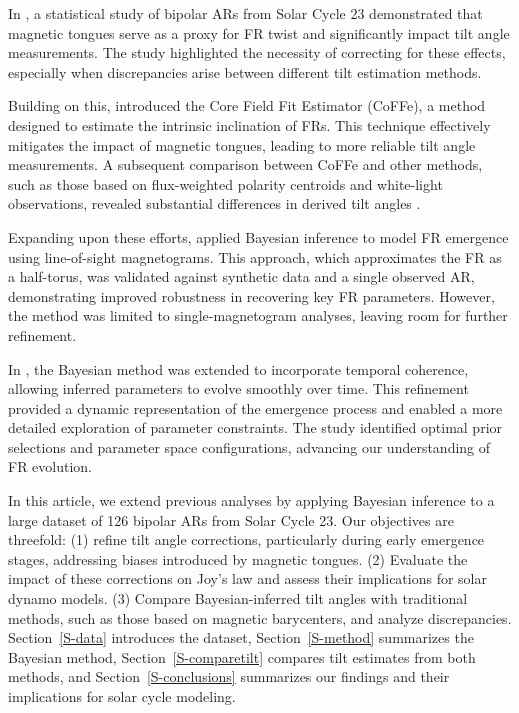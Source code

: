 \documentclass[namedreferences,hyperref,optionalrh]{spr-sola}
\begin{document}
In \citet{Poisson16}, a statistical study of bipolar ARs from Solar Cycle 23 demonstrated that magnetic tongues serve as a proxy for FR twist and significantly impact tilt angle measurements. The study highlighted the necessity of correcting for these effects, especially when discrepancies arise between different tilt estimation methods.

Building on this, \citet{Poisson20a} introduced the Core Field Fit Estimator (CoFFe), a method designed to estimate the intrinsic inclination of FRs. This technique effectively mitigates the impact of magnetic tongues, leading to more reliable tilt angle measurements. A subsequent comparison between CoFFe and other methods, such as those based on flux-weighted polarity centroids and white-light observations, revealed substantial differences in derived tilt angles \citep{Poisson2020b}.

Expanding upon these efforts, \citet{Poisson22} applied Bayesian inference to model FR emergence using line-of-sight magnetograms. This approach, which approximates the FR as a half-torus, was validated against synthetic data and a single observed AR, demonstrating improved robustness in recovering key FR parameters. However, the method was limited to single-magnetogram analyses, leaving room for further refinement.

In \citet{Poisson24}, the Bayesian method was extended to incorporate temporal coherence, allowing inferred parameters to evolve smoothly over time. This refinement provided a dynamic representation of the emergence process and enabled a more detailed exploration of parameter constraints. The study identified optimal prior selections and parameter space configurations, advancing our understanding of FR evolution.

In this article, we extend previous analyses by applying Bayesian inference to a large dataset of 126 bipolar ARs from Solar Cycle 23. Our objectives are threefold: (1) refine tilt angle corrections, particularly during early emergence stages, addressing biases introduced by magnetic tongues. (2) Evaluate the impact of these corrections on Joy’s law and assess their implications for solar dynamo models. (3) Compare Bayesian-inferred tilt angles with traditional methods, such as those based on magnetic barycenters, and analyze discrepancies. 
Section~\ref{S-data} introduces the dataset, Section~\ref{S-method} summarizes the Bayesian method, Section~\ref{S-comparetilt} compares tilt estimates from both methods, and Section~\ref{S-conclusions} summarizes our findings and their implications for solar cycle modeling.
\end{document}
